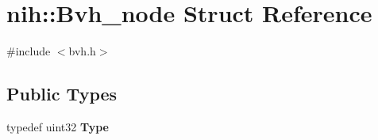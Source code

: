 \hypertarget{structnih_1_1_bvh__node}{
\section{nih\-:\-:\-Bvh\-\_\-node \-Struct \-Reference}
\label{structnih_1_1_bvh__node}
}


{\ttfamily \#include $<$bvh.\-h$>$}

\subsection*{\-Public \-Types}
\begin{DoxyCompactItemize}
\item 
\hypertarget{structnih_1_1_bvh__node_ac430632437ba9be16f431dd72b4a8c00}{
typedef uint32 {\bfseries \-Type}}
\label{structnih_1_1_bvh__node_ac430632437ba9be16f431dd72b4a8c00}

\end{DoxyCompactItemize}
